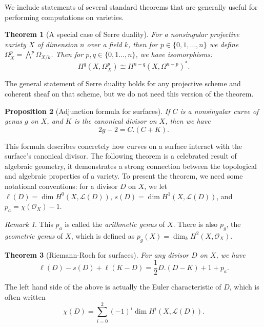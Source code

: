 \documentclass[12pt,twoside]{reedthesis}
\theoremstyle{plain}
\newtheorem{theorem}{Theorem}[chapter]
\newtheorem{proposition}[theorem]{Proposition}
\theoremstyle{definition}
\theoremstyle{remark}
\newtheorem{remark}{Remark}[section]
\newcommand{\calO}{\mathcal{O}}
\newcommand{\calL}{\mathcal{L}}
\begin{document}
We include statements of several standard theorems that are generally useful for performing computations on varieties.
\begin{theorem}[A special case of Serre duality]
For a nonsingular projective variety $X$ of dimension $n$ over a field $k$, then for $p\in\{0,1,\ldots,n\}$ we define $\Omega_{X}^p=\bigwedge^p\Omega_{X/k}$. Then for $p,q\in\{0,1\ldots,n\}$, we have isomorphisms:
\[
H^q(X,\Omega_X^p)\cong H^{n-q}(X,\Omega^{n-p})^*.
\]
\end{theorem}
\noindent The general statement of Serre duality holds for any projective scheme and coherent sheaf on that scheme, but we do not need this version of the theorem.
\begin{proposition}[Adjunction formula for surfaces]
If $C$ is a nonsingular curve of genus $g$ on $X$, and $K$ is the canonical divisor on $X$, then we have
\[2g-2=C.(C+K).\]
\end{proposition}
\noindent This formula describes concretely how curves on a surface interact with the surface's canonical divisor.
The following theorem is a celebrated result of algebraic geometry, it demonstrates a strong connection between the topological and algebraic properties of a variety. To present the theorem, we need some notational conventions: for a divisor $D$ on $X$, we let $\ell(D)=\dim H^0(X,\mathcal{L}(D))$, $s(D)=\dim H^1(X,\mathcal{L}(D))$, and $p_a=\chi(\calO_X)-1$.
\begin{remark}
This $p_a$ is called the \emph{arithmetic genus} of $X$. There is also $p_g$, the \emph{geometric genus} of $X$, which is defined as $p_g(X)=\dim_k H^2(X,\calO_X)$.
\end{remark}
\begin{theorem}[Riemann-Roch for surfaces]
For any divisor $D$ on $X$, we have \[\ell(D)-s(D)+\ell(K-D)=\frac{1}{2}D.(D-K)+1+p_a.\]
\end{theorem}
\noindent The left hand side of the above is actually the Euler characteristic of $D$, which is often written
\[
\chi(D)=\sum_{i=0}^2 (-1)^i\dim H^i(X,\calL(D)).
\]
\end{document}
